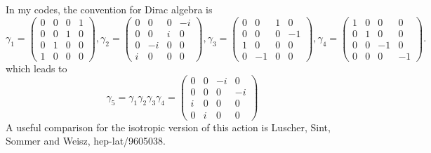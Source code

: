 \documentclass[12pt]{article}
\begin{document}
In my codes, the convention for Dirac algebra is
\[
\gamma_1 = \left(\begin{array}{cccc} 0 & 0 & 0 & 1 \\ 
           0 & 0 & 1 & 0 \\ 0 & 1 & 0 & 0 \\ 1 & 0 & 0 & 0 \end{array}\right),
\gamma_2 = \left(\begin{array}{cccc} 0 & 0 & 0 & -i \\ 
           0 & 0 & i & 0 \\ 0 & -i & 0 & 0 \\ i & 0 & 0 & 0 \end{array}\right),
\gamma_3 = \left(\begin{array}{cccc} 0 & 0 & 1 & 0 \\ 
           0 & 0 & 0 & -1 \\ 1 & 0 & 0 & 0 \\ 0 & -1 & 0 & 0 \end{array}\right),
\gamma_4 = \left(\begin{array}{cccc} 1 & 0 & 0 & 0 \\ 
           0 & 1 & 0 & 0 \\ 0 & 0 & -1 & 0 \\ 0 & 0 & 0 & -1 \end{array}\right).
\]
which leads to
\[
\gamma_5 = \gamma_1\gamma_2\gamma_3\gamma_4
         = \left(\begin{array}{cccc} 0 & 0 & -i & 0 \\ 
           0 & 0 & 0 & -i \\ i & 0 & 0 & 0 \\ 0 & i & 0 & 0 \end{array}\right)
\]
A useful comparison for the isotropic version of this action is
Luscher, Sint, Sommer and Weisz, hep-lat/9605038.
\end{document}
